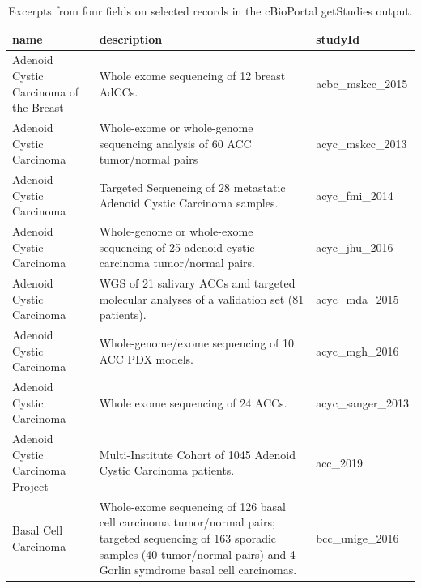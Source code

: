 \documentclass[graybox]{svmult}
\begin{document}
\begin{table}
\caption{\label{tab:tab-cball}Excerpts from four fields on selected records in the cBioPortal getStudies output.}
\begin{tabular}{p{5cm}p{5cm}l}
name & description & studyId \\ \hline
Adenoid Cystic Carcinoma of the Breast & Whole exome sequencing of 12 breast AdCCs. & acbc\_mskcc\_2015 \\
Adenoid Cystic Carcinoma & Whole-exome or whole-genome sequencing analysis of 60 ACC tumor/normal pairs & acyc\_mskcc\_2013 \\
Adenoid Cystic Carcinoma & Targeted Sequencing of 28 metastatic Adenoid Cystic Carcinoma samples. & acyc\_fmi\_2014 \\
Adenoid Cystic Carcinoma & Whole-genome or whole-exome sequencing of 25 adenoid cystic carcinoma tumor/normal pairs. & acyc\_jhu\_2016 \\
Adenoid Cystic Carcinoma & WGS of 21 salivary ACCs and targeted molecular analyses of a validation set (81 patients). & acyc\_mda\_2015 \\
Adenoid Cystic Carcinoma & Whole-genome/exome sequencing of 10 ACC PDX models. & acyc\_mgh\_2016 \\
Adenoid Cystic Carcinoma & Whole exome sequencing of 24 ACCs. & acyc\_sanger\_2013 \\
Adenoid Cystic Carcinoma Project & Multi-Institute Cohort of 1045 Adenoid Cystic Carcinoma patients. & acc\_2019 \\
Basal Cell Carcinoma & Whole-exome sequencing of 126 basal cell carcinoma tumor/normal pairs; targeted sequencing of 163 sporadic samples (40 tumor/normal pairs) and 4 Gorlin symdrome basal cell carcinomas. & bcc\_unige\_2016 \\
\end{tabular}
\end{table}
\end{document}

